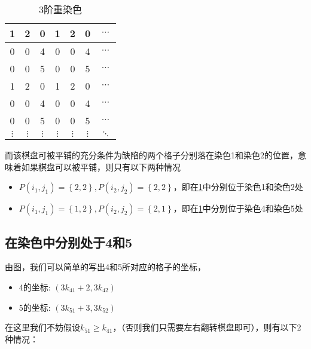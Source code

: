 \begin{table}[h]
	\centering
	\caption{3阶重染色}
	\begin{tabular}{|c|c|c|c|c|c|c|}
		\hline
		1        & 2        & 0        & 1        & 2        & 0        & $\cdots$ \\
		\hline
		0        & 0        & 4        & 0        & 0        & 4        & $\cdots$ \\
		\hline
		0        & 0        & 5        & 0        & 0        & 5        & $\cdots$ \\
		\hline
		1        & 2        & 0        & 1        & 2        & 0        & $\cdots$ \\
		\hline
		0        & 0        & 4        & 0        & 0        & 4        & $\cdots$ \\
		\hline
		0        & 0        & 5        & 0        & 0        & 5        & $\cdots$ \\
		\hline
		$\vdots$ & $\vdots$ & $\vdots$ & $\vdots$ & $\vdots$ & $\vdots$ & $\ddots$ \\
		\hline
	\end{tabular}
	\label{fig:3-order-staining-last}
\end{table}

而该棋盘可被平铺的充分条件为缺陷的两个格子分别落在染色1和染色2的位置，意味着如果棋盘可以被平铺，则只有以下两种情况

\begin{itemize}
	\item $P(i_1, j_1) = \left\{2, 2\right\}, P(i_2, j_2) = \left\{2, 2\right\}$，即在\ref*{fig:3-order-staining-last}中分别位于染色1和染色2处
	\item $P(i_1, j_1) = \left\{1, 2\right\}, P(i_2, j_2) = \left\{2, 1\right\}$，即在\ref*{fig:3-order-staining-last}中分别位于染色4和染色5处
\end{itemize}

\subsection{在染色中分别处于4和5}

由图，我们可以简单的写出4和5所对应的格子的坐标，

\begin{itemize}
	\item 4的坐标: $(3k_{41} + 2, 3k_{42})$
	\item 5的坐标: $(3k_{51} + 3, 3k_{52})$
\end{itemize}

在这里我们不妨假设$k_{51} \ge k_{41}$，（否则我们只需要左右翻转棋盘即可），则有以下2种情况：



